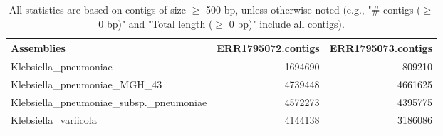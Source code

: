 \documentclass[12pt,a4paper]{article}
\begin{document}
\begin{table}[ht]
\begin{center}
\caption{All statistics are based on contigs of size $\geq$ 500 bp, unless otherwise noted (e.g., "\# contigs ($\geq$ 0 bp)" and "Total length ($\geq$ 0 bp)" include all contigs).}
\begin{tabular}{|l*{2}{|r}|}
\hline
Assemblies & ERR1795072.contigs & ERR1795073.contigs \\ \hline
Klebsiella\_pneumoniae & 1694690 & 809210 \\ \hline
Klebsiella\_pneumoniae\_MGH\_43 & 4739448 & 4661625 \\ \hline
Klebsiella\_pneumoniae\_subsp.\_pneumoniae & 4572273 & 4395775 \\ \hline
Klebsiella\_variicola & 4144138 & 3186086 \\ \hline
\end{tabular}
\end{center}
\end{table}
\end{document}
